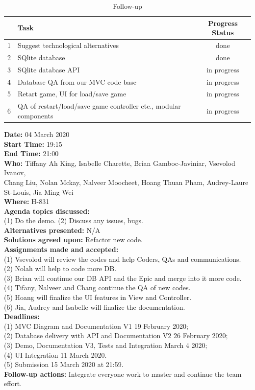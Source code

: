 \documentclass[12pt]{article}
\begin{document}
\begin{table}[h!]
\centering
 \begin{tabular}{||l l c ||} 
 \hline
   & Task & Progress Status\\ [0.5ex] 
 \hline\hline
 1 & Suggest technological alternatives & done \\
 2 & SQlite database & done\\
 3 & SQlite database API & in progress\\
 4 & Database QA from our MVC code base & in progress\\
 5 & Retart game, UI for load/save game & in progress\\
 6 & QA of restart/load/save game controller etc., modular components & in progress\\[1ex] 
 \hline
 \end{tabular}
\caption{Follow-up }
\label{table:1}
\end{table}

\newpage

{\bf Date:} 04 March 2020\\
{\bf Start Time:} 19:15\\
{\bf End Time:} 21:00\\
{\bf Who:} Tiffany Ah King, Isabelle Charette, Brian Gamboc-Javiniar, Vsevolod Ivanov,\\
Chang Liu, Nolan Mckay, Nalveer Moocheet, Hoang Thuan Pham, Audrey-Laure St-Louis, Jia Ming Wei\\
{\bf Where:} H-831\\
{\bf Agenda topics discussed:} \\
(1) Do the demo.
(2) Discuss any issues, bugs.\\
{\bf Alternatives presented:} N/A\\
{\bf Solutions agreed upon:} Refactor new code.\\
{\bf Assignments made and accepted:} \\
(1) Vsevolod will review the codes and help Coders, QAs and communications.\\
(2) Nolah will help to code more DB.\\
(3) Brian will continue our DB API and the Epic and merge into it more code.\\
(4) Tifany, Nalveer and Chang continue the QA of new codes.\\
(5) Hoang will finalize the UI features in View and Controller.\\
(6) Jia, Audrey and Isabelle will finalize the documentation.\\
{\bf Deadlines:} \\
(1) MVC Diagram and Documentation V1 19 February 2020;\\
(2) Database delivery with API and Documentation V2 26 February 2020;\\
(3) Demo, Documentation V3, Tests and Integration March 4 2020; \\
(4) UI Integration 11 March 2020. \\
(5) Submission 15 March 2020 at 21:59. \\
{\bf Follow-up actions:} Integrate everyone work to master and continue the team effort.\\
\end{document}
